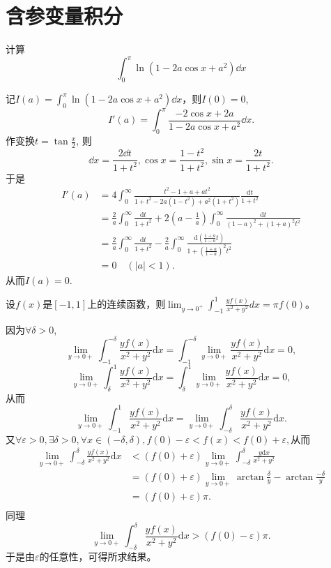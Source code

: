   \section{含参变量积分}

  \begin{exercise}
    计算 
    \begin{equation*}
      \int_0^{\pi}\ln(1-2a\cos x+a^2)\dd x
    \end{equation*}
  \end{exercise}

  \begin{solution}
   记$I(a)=\int_0^{\pi}\ln(1-2a\cos x+a^2)\dd x$，则$I(0)=0$, 
   $$I'(a)=\int_0^{\pi}\frac{-2\cos x+2a}{1-2a\cos x+a^2}\dd x.$$
  作变换$t=\tan\frac{x}{2}$, 
  则$$\dd x=\frac{2\dd t}{1+t^2},\cos x=\frac{1-t^2}{1+t^2},\sin x=\frac{2t}{1+t^2}.$$
  于是
  \begin{align*}
  I'(a)&=4\int_0^{\infty}\frac{t^2-1+a+at^2}{1+t^2-2a(1-t^2)+a^2(1+t^2)}\frac{\mathrm{d}t}{1+t^2}\\
  &=\frac{2}{a}\int_0^{\infty}\frac{\mathrm{d}t}{1+t^2}+2(a-\frac{1}{a})\int_0^{\infty}\frac{\mathrm{d}t}{(1-a)^2+(1+a)^2t^2}\\
  &=\frac{2}{a}\int_0^{\infty}\frac{\mathrm{d}t}{1+t^2}-\frac{2}{a}\int_0^{\infty}\frac{\mathrm{d}(\frac{1+a}{1-a}t)}{1+(\frac{1+a}{1-a})^2t^2}\\
  &=0\quad(|a|<1).
  \end{align*}
  从而$I(a)=0.$
  \end{solution}

  \begin{exercise}
   设$f(x)$是$[-1,1]$上的连续函数，则$\displaystyle\lim_{y\rightarrow0^+}\int_{-1}^{1}\frac{yf(x)}{x^2+y^2}dx=\pi f(0)$。
  \end{exercise}

  \begin{solution}
     因为$\forall\delta>0$, 
$$\lim_{y\rightarrow0+}\int_{-1}^{-\delta}\frac{yf(x)}{x^2+y^2}\mathrm{d}x=\int_{-1}^{-\delta}\lim_{y\rightarrow0+}\frac{yf(x)}{x^2+y^2}\mathrm{d}x=0,$$
$$\lim_{y\rightarrow0+}\int^{1}_{\delta}\frac{yf(x)}{x^2+y^2}\mathrm{d}x=\int^{1}_{\delta}\lim_{y\rightarrow0+}\frac{yf(x)}{x^2+y^2}\mathrm{d}x=0,$$
从而
$$\lim_{y\rightarrow0+}\int_{-1}^{1}\frac{yf(x)}{x^2+y^2}\mathrm{d}x=\lim_{y\rightarrow0+}\int_{-\delta}^{\delta}\frac{yf(x)}{x^2+y^2}\mathrm{d}x.$$
又$\forall\varepsilon>0,\exists\delta>0,\forall x\in(-\delta,\delta),f(0)-\varepsilon<f(x)<f(0)+\varepsilon,$从而
\begin{align*}
\lim_{y\rightarrow0+}\int_{-\delta}^{\delta}\frac{yf(x)}{x^2+y^2}\mathrm{d}x&<(f(0)+\varepsilon)\lim_{y\rightarrow0+}\int_{-\delta}^{\delta}\frac{y\mathrm{d}x}{x^2+y^2}\\
&=(f(0)+\varepsilon)\lim_{y\rightarrow0+}\arctan\frac{\delta}{y}-\arctan\frac{-\delta}{y}\\
&=(f(0)+\varepsilon)\pi.\\
\end{align*}
同理$$\lim_{y\rightarrow0+}\int_{-\delta}^{\delta}\frac{yf(x)}{x^2+y^2}\mathrm{d}x>(f(0)-\varepsilon)\pi.$$
于是由$\varepsilon$的任意性，可得所求结果。 
  \end{solution}

